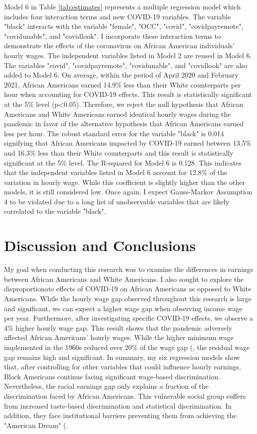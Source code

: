 \documentclass[12pt, english]{article}
\begin{document}
Model 6 in Table \ref{tab:estimates} represents a multiple regression model which includes four interaction terms and new COVID-19 variables. The variable "black" interacts with the variable "female", "OCC", "covid", "covidpayremote", "covidunable", and "covidlook". I incorporate these interaction terms to demonstrate the effects of the coronavirus on African American individuals' hourly wages. The independent variables listed in Model 2 are reused in Model 6. The variables "covid", "covidpayremote", "covidunable", and "covidlook" are also added to Model 6. On average, within the period of April 2020 and February 2021, African Americans earned 14.9\% less than their White counterparts per hour when accounting for COVID-19 effects. This result is statistically significant at the 5\% level (p\textless0.05). Therefore, we reject the null hypothesis that African Americans and White Americans earned identical hourly wages during the pandemic in favor of the alternative hypothesis that African Americans earned less per hour. The robust standard error for the variable "black" is 0.014 signifying that African Americans impacted by COVID-19 earned between 13.5\% and 16.3\% less than their White counterparts and this result is statistically significant at the 5\% level. The R-squared for Model 6 is 0.128. This indicates that the independent variables listed in Model 6 account for 12.8\% of the variation in hourly wage. While this coefficient is slightly higher than the other models, it is still considered low. Once again, I expect Gauss-Markov Assumption 4 to be violated due to a long list of unobservable variables that are likely correlated to the variable "black".


\section{Discussion and Conclusions}

My goal when conducting this research was to examine the differences in earnings between African Americans and White Americans. I also sought to explore the disproportionate effects of COVID-19 on African Americans as opposed to White Americans. While the hourly wage gap observed throughout this research is large and significant, we can expect a higher wage gap when observing income wage per year. Furthermore, after investigating specific COVID-19 effects, we observe a 4\% higher hourly wage gap. This result shows that the pandemic adversely affected African Americans' hourly wages. While the higher minimum wage implemented in the 1960s reduced over 20\% of the wage gap (\citet{DerenoncourtMontialoux2020}, the residual wage gap remains high and significant. In summary, my six regression models show that, after controlling for other variables that could influence hourly earnings, Black Americans continue facing significant wage-based discrimination. Nevertheless, the racial earnings gap only explains a fraction of the discrimination faced by African Americans. This vulnerable social group suffers from increased taste-based discrimination and statistical discrimination. In addition, they face institutional barriers preventing them from achieving the "American Dream"
(\citet{Koechlin2019}.
\end{document}
